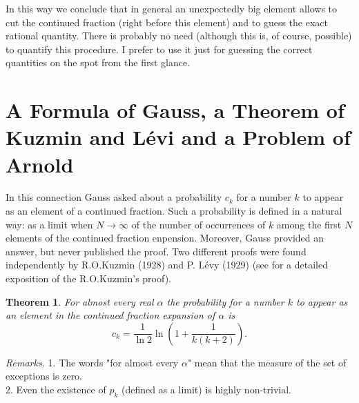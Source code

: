 \documentclass[12pt,letterpaper]{book}
\newtheorem{theorem}{Theorem}
\begin{document}
In this way we conclude that in general an unexpectedly big element
allows to cut the continued fraction (right before this element) and
to guess the exact rational quantity. There is probably no need
(although this is, of course, possible) to quantify this procedure.
I prefer to use it just for guessing the correct quantities on the
spot from the first glance.


\section{A Formula of Gauss, a Theorem of Kuzmin and L\'evi
and a Problem of Arnold}   In this
connection Gauss asked about a probability $c_k$ for a number $k$ to
appear as an element of a continued fraction. Such a probability is
defined in a natural way: as a limit when $N \rightarrow \infty$ of
the number of occurrences of $k$ among the first $N$ elements of the
continued fraction enpension. Moreover, Gauss provided an answer,
but never published the proof. Two different proofs were found
independently by R.O.Kuzmin (1928) and P. L\'evy (1929) (see
\cite{Khinchin} for a detailed exposition of the R.O.Kuzmin's
proof). 

\begin{theorem} \label{Gauss}
For almost every real $\alpha$ the probability for a number $k$ to
appear as an element in the continued fraction expansion of $\alpha$
is
\begin{equation} \label{ga}
c_k=\frac{1}{\ln 2} \ln \left( 1 + \frac{1}{k(k+2)} \right).
\end{equation}
\end{theorem}

{\sl Remarks.} 1. The words "for almost every $\alpha$" mean that
the measure of the set of exceptions is zero. \\
2. Even the existence of $p_k$ (defined as a limit) is highly
non-trivial.
\end{document}
